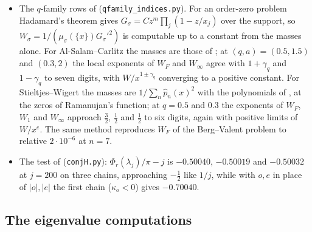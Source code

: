 \begin{itemize}
  (c) (\texttt{bv\_closed\_forms.py}).
\item The $q$-family rows of  (\texttt{qfamily\_indices.py}). For an order-zero problem
  Hadamard's theorem gives $G_\sigma=C z^m\prod_j(1-z/x_j)$ over the support, so
  $W_\sigma=1/(\mu_\sigma(\{x\})G_\sigma'^2)$ is computable up to a constant from the masses alone. For
  Al-Salam--Carlitz the masses are those of \cite[Ex.~4.2]{BergSzwarc2026}; at $(q,a)=(0.5,1.5)$ and
  $(0.3,2)$ the local exponents of $W_F$ and $W_\infty$ agree with $1+\gamma_q$ and $1-\gamma_q$ to seven
  digits, with $W/x^{1\pm\gamma_q}$ converging to a positive constant. For Stieltjes--Wigert the masses
  are $1/\sum_n\hat p_n(x)^2$ with the polynomials of \cite[Ex.~4.3]{BergSzwarc2026}, at the zeros of
  Ramanujan's function; at $q=0.5$ and $0.3$ the exponents of $W_F$, $W_1$ and $W_\infty$ approach
  $\frac32$, $\frac12$ and $\frac12$ to six digits, again with positive limits of $W/x^{e}$. The same
  method reproduces $W_F$ of the Berg--Valent problem to relative $2\cdot10^{-6}$ at $n=7$.
\item The test of  (\texttt{conjH.py}): $\Phi_r(\lambda_j)/\pi-j$ is $-0.50040$, $-0.50019$ and
  $-0.50032$ at $j=200$ on three chains, approaching $-\frac12$ like $1/j$, while with $o,e$ in place of
  $|o|,|e|$ the first chain ($\kappa_o<0$) gives $-0.70040$.
\end{itemize}

\subsection{The eigenvalue computations}

